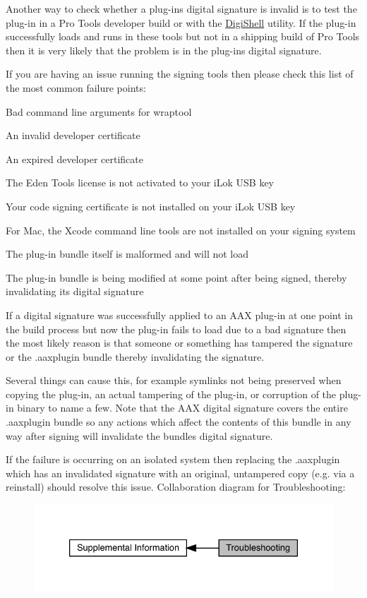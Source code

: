 Another way to check whether a plug-\/in\textquotesingle{}s digital signature is invalid is to test the plug-\/in in a Pro Tools developer build or with the \mbox{\hyperlink{a00835}{Digi\+Shell}} utility. If the plug-\/in successfully loads and runs in these tools but not in a shipping build of Pro Tools then it is very likely that the problem is in the plug-\/in\textquotesingle{}s digital signature.

If you are having an issue running the signing tools then please check this list of the most common failure points\+:


\begin{DoxyEnumerate}
\item Bad command line arguments for {\ttfamily wraptool}  
\item An invalid developer certificate  
\item An expired developer certificate  
\item The Eden Tools license is not activated to your i\+Lok U\+SB key  
\item Your code signing certificate is not installed on your i\+Lok U\+SB key  
\item For Mac, the Xcode command line tools are not installed on your signing system  
\item The plug-\/in bundle itself is malformed and will not load  
\item The plug-\/in bundle is being modified at some point after being signed, thereby invalidating its digital signature  
\end{DoxyEnumerate}

If a digital signature was successfully applied to an A\+AX plug-\/in at one point in the build process but now the plug-\/in fails to load due to a bad signature then the most likely reason is that someone or something has tampered the signature or the .aaxplugin bundle thereby invalidating the signature.

Several things can cause this, for example symlinks not being preserved when copying the plug-\/in, an actual tampering of the plug-\/in, or corruption of the plug-\/in binary to name a few. Note that the A\+AX digital signature covers the entire .aaxplugin bundle so any actions which affect the contents of this bundle in any way after signing will invalidate the bundle\textquotesingle{}s digital signature.

If the failure is occurring on an isolated system then replacing the .aaxplugin which has an invalidated signature with an original, untampered copy (e.\+g. via a reinstall) should resolve this issue. Collaboration diagram for Troubleshooting\+:
\nopagebreak
\begin{figure}[H]
\begin{center}
\leavevmode
\includegraphics[width=333pt]{a00842}
\end{center}
\end{figure}

